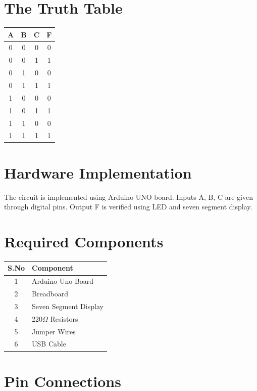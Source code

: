 \documentclass[a4paper,12pt]{article}
\begin{document}
\section*{The Truth Table}

\begin{center}
\begin{tabular}{|c|c|c|c|}
\hline
A & B & C & F \\
\hline
0 & 0 & 0 & 0 \\
0 & 0 & 1 & 1 \\
0 & 1 & 0 & 0 \\
0 & 1 & 1 & 1 \\
1 & 0 & 0 & 0 \\
1 & 0 & 1 & 1 \\
1 & 1 & 0 & 0 \\
1 & 1 & 1 & 1 \\
\hline
\end{tabular}
\end{center}

\section*{Hardware Implementation}

The circuit is implemented using Arduino UNO board.  
Inputs A, B, C are given through digital pins.  
Output F is verified using LED and seven segment display.

\section*{Required Components}

\begin{center}
\begin{tabular}{|c|l|}
\hline
S.No & Component \\ \hline
1 & Arduino Uno Board \\
2 & Breadboard \\
3 & Seven Segment Display \\
4 & 220$\Omega$ Resistors \\
5 & Jumper Wires \\
6 & USB Cable \\
\hline
\end{tabular}
\end{center}

\section*{Pin Connections}
\end{document}
